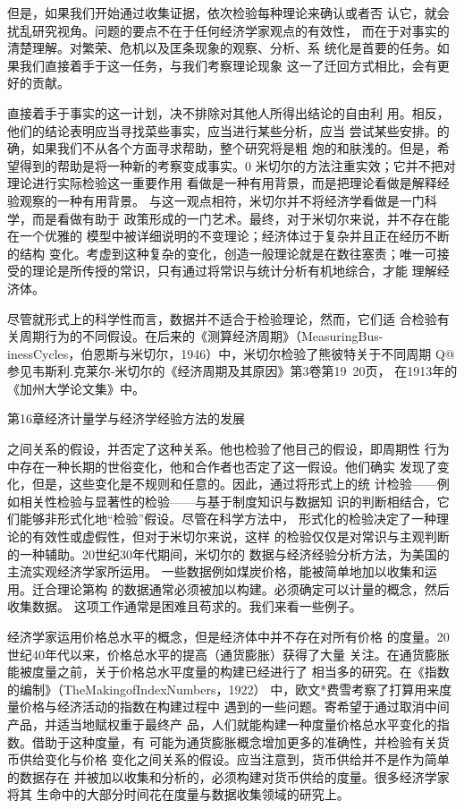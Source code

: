 但是，如果我们开始通过收集证据，依次检验每种理论来确认或者否
认它，就会扰乱研究视角。问题的要点不在于任何经济学家观点的有效性，
而在于对事实的清楚理解。对繁荣、危机以及匡条现象的观察、分析、系
统化是首要的任务。如果我们直接着手于这一任务，与我们考察理论现象
这一了迁回方式相比，会有更好的贡献。

直接着手于事实的这一计划，决不排除对其他人所得出结论的自由利
用。相反，他们的结论表明应当寻找菜些事实，应当进行某些分析，应当
尝试某些安排。的确，如果我们不从各个方面寻求帮助，整个研究将是粗
炮的和肤浅的。但是，希望得到的帮助是将一种新的考察变成事实。0
米切尔的方法注重实效；它并不把对理论进行实际检验这一重要作用
看做是一种有用背景，而是把理论看做是解释经验观察的一种有用背景。
与这一观点相符，米切尔并不将经济学看做是一门科学，而是看做有助于
政策形成的一门艺术。最终，对于米切尔来说，并不存在能在一个优雅的
模型中被详细说明的不变理论；经济体过于复杂并且正在经历不断的结构
变化。考虚到这种复杂的变化，创造一般理论就是在数往塞责；唯一可接
受的理论是所传授的常识，只有通过将常识与统计分析有机地综合，才能
理解经济体。

尽管就形式上的科学性而言，数据并不适合于检验理论，然而，它们适
合检验有关周期行为的不同假设。在后来的《测算经济周期》（MeasuringBus-
inessCycles，伯恩斯与米切尔，1946）中，米切尔检验了熊彼特关于不同周期
Q@参见韦斯利.克莱尔-米切尔的《经济周期及其原因》第3卷第19~20页，
在1913年的《加州大学论文集》中。





第16章经济计量学与经济学经验方法的发展


之间关系的假设，并否定了这种关系。他也检验了他目己的假设，即周期性
行为中存在一种长期的世俗变化，他和合作者也否定了这一假设。他们确实
发现了变化，但是，这些变化是不规则和任意的。因此，通过将形式上的统
计检验——例如相关性检验与显著性的检验——与基于制度知识与数据知
识的判断相结合，它们能够非形式化地“检验”假设。尽管在科学方法中，
形式化的检验决定了一种理论的有效性或虚假性，但对于米切尔来说，这样
的检验仅仅是对常识与主观判断的一种辅助。20世纪30年代期间，米切尔的
数据与经济经验分析方法，为美国的主流实观经济学家所运用。
一些数据例如煤炭价格，能被简单地加以收集和运用。迁合理论第构
的数据通常必须被加以构建。必须确定可以计量的概念，然后收集数据。
这项工作通常是困难且苟求的。我们来看一些例子。

经济学家运用价格总水平的概念，但是经济体中并不存在对所有价格
的度量。20世纪40年代以来，价格总水平的提高（通货膨胀）获得了大量
关注。在通货膨胀能被度量之前，关于价格总水平度量的构建已经进行了
相当多的研究。在《指数的编制》（TheMakingofIndexNumbers，1922）
中，欧文*费雪考察了打算用来度量价格与经济活动的指数在构建过程中
遇到的一些问题。寄希望于通过取消中间产品，并适当地赋权重于最终产
品，人们就能构建一种度量价格总水平变化的指数。借助于这种度量，有
可能为通货膨胀概念增加更多的准确性，并检验有关货币供给变化与价格
变化之间关系的假设。应当注意到，货币供给并不是作为简单的数据存在
并被加以收集和分析的，必须构建对货币供给的度量。很多经济学家将其
生命中的大部分时间花在度量与数据收集领域的研究上。

